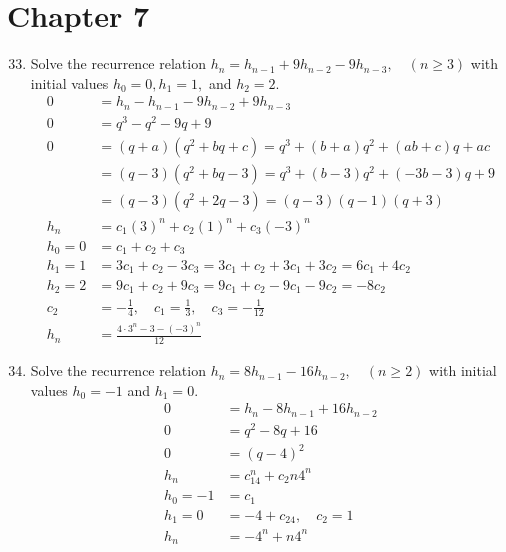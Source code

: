 \documentclass{article}
\begin{document}
\section*{Chapter 7}
\begin{enumerate}
  \setcounter{enumi}{32}
  \item
  Solve the recurrence relation $h_n=h_{n-1}+9h_{n-2}-9h_{n-3},\quad(n\ge3)$ with initial values $h_0=0,h_1=1,$ and $h_2=2$.
  \begin{align*}
    0&=h_n-h_{n-1}-9h_{n-2}+9h_{n-3}\\
    0&=q^3-q^2-9q+9\\
    0&=(q+a)(q^2+bq+c)=q^3+(b+a)q^2+(ab+c)q+ac\\
    &=(q-3)(q^2+bq-3)=q^3+(b-3)q^2+(-3b-3)q+9\\
    &=(q-3)(q^2+2q-3)=(q-3)(q-1)(q+3)\\
    h_n&=c_1(3)^n+c_2(1)^n+c_3(-3)^n\\
    h_0=0&=c_1+c_2+c_3\\
    h_1=1&=3c_1+c_2-3c_3=3c_1+c_2+3c_1+3c_2=6c_1+4c_2\\
    h_2=2&=9c_1+c_2+9c_3=9c_1+c_2-9c_1-9c_2=-8c_2\\
    c_2&=-\frac{1}{4},\quad c_1=\frac{1}{3},\quad c_3=-\frac{1}{12}\\
    h_n&=\frac{4\cdot3^n-3-(-3)^n}{12}
  \end{align*}
  \item
  Solve the recurrence relation $h_n=8h_{n-1}-16h_{n-2},\quad(n\ge2)$ with initial values $h_0=-1$ and $h_1=0$.
  \begin{align*}
    0&=h_n-8h_{n-1}+16h_{n-2}\\
    0&=q^2-8q+16\\
    0&=(q-4)^2\\
    h_n&=c_14^n+c_2n4^n\\
    h_0={-1}&=c_1\\
    h_1=0&=-4+c_24,\quad c_2=1\\
    h_n&=-4^n+n4^n
  \end{align*}
  \setcounter{enumi}{36}
%
%
%

\end{enumerate}
\end{document}

